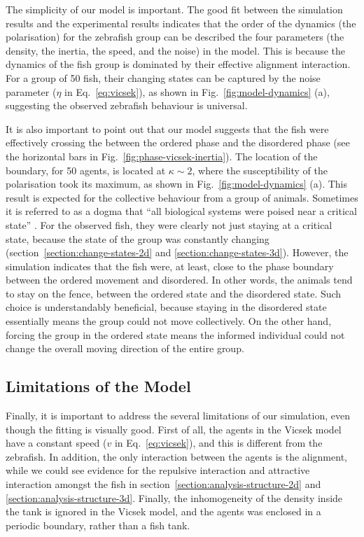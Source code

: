 \documentclass[11pt,twoside]{report}
\begin{document}
The simplicity of our model is important. The good fit between the simulation results and the experimental results indicates that the order of the dynamics (the polarisation) for the zebrafish group can be described the four parameters (the density, the inertia, the speed, and the noise) in the model. This is because the dynamics of the fish group is dominated by their effective alignment interaction. For a group of 50 fish, their changing states can be captured by the noise parameter ($\eta$ in Eq.~\ref{eq:vicsek}), as shown in Fig.~\ref{fig:model-dynamics} (a), suggesting the observed zebrafish behaviour is universal.


It is also important to point out that our model suggests that the fish were effectively crossing the between the ordered phase and the disordered phase (see the horizontal bars in Fig.~\ref{fig:phase-vicsek-inertia}). The location of the boundary, for 50 agents, is located at $\kappa \sim 2$, where the susceptibility of the polarisation took its maximum, as shown in Fig.~\ref{fig:model-dynamics} (a).
This result is expected for the collective behaviour from a group of animals. Sometimes it is referred to as a dogma that ``all biological systems were poised near a critical state'' \cite{mora2011}. For the observed fish, they were clearly not just staying at a critical state, because the state of the group was constantly changing (section~\ref{section:change-states-2d} and \ref{section:change-states-3d}). However, the simulation indicates that the fish were, at least, close to the phase boundary between the ordered movement and disordered. In other words, the animals tend to stay on the fence, between the ordered state and the disordered state.
Such choice is understandably beneficial, because staying in the disordered state essentially means the group could not move collectively. On the other hand, forcing the group in the ordered state means the informed individual could not change the overall moving direction of the entire group.

\subsection{Limitations of the Model}

Finally, it is important to address the several limitations of our simulation, even though the fitting is visually good. First of all, the agents in the Vicsek model have a constant speed ($v$ in Eq.~\ref{eq:vicsek}), and this is different from the zebrafish. In addition, the only interaction between the agents is the alignment, while we could see evidence for the repulsive interaction and attractive interaction amongst the fish in section~\ref{section:analysis-structure-2d} and \ref{section:analysis-structure-3d}. Finally, the inhomogeneity of the density inside the tank is ignored in the Vicsek model, and the agents was enclosed in a periodic boundary, rather than a fish tank.
\end{document}
